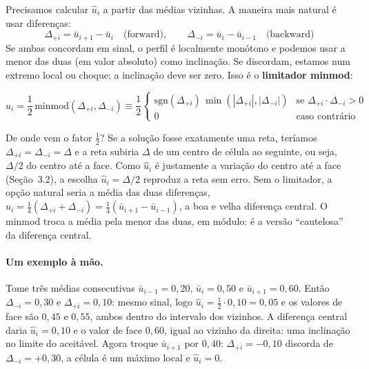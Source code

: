 \documentclass[10pt,a4paper]{article}
\newcommand{\ub}{\bar u}
\newcommand{\uh}{\hat u}
\begin{document}
Precisamos calcular $\uh_i$ a partir das médias vizinhas. A maneira mais natural é usar diferenças:
\begin{equation}\label{eq:deltas}
\Delta_{+i}=\ub_{i+1}-\ub_i\quad\text{(forward)},\qquad \Delta_{-i}=\ub_i-\ub_{i-1}\quad\text{(backward)}
\end{equation}
Se ambas concordam em sinal, o perfil é localmente monótono e podemos usar a menor das duas (em valor absoluto) como inclinação. Se discordam, estamos num extremo local ou choque; a inclinação deve ser zero. Isso é o \textbf{limitador minmod}:
\begin{destaque}
\begin{equation}\label{eq:minmod}
\uh_i=\frac12\,\mathrm{minmod}(\Delta_{+i},\Delta_{-i})\equiv\frac12
\begin{cases}
\mathrm{sgn}(\Delta_{+i})\,\min(|\Delta_{+i}|,|\Delta_{-i}|) & \text{se }\Delta_{+i}\cdot\Delta_{-i}>0\\[2pt]
0 & \text{caso contrário}
\end{cases}
\end{equation}
\end{destaque}

De onde vem o fator $\tfrac12$? Se a solução fosse exatamente uma reta, teríamos $\Delta_{+i}=\Delta_{-i}=\Delta$ e a reta subiria $\Delta$ de um centro de célula ao seguinte, ou seja, $\Delta/2$ do centro até a face. Como $\uh_i$ é justamente a variação do centro até a face (Seção~3.2), a escolha $\uh_i=\Delta/2$ reproduz a reta sem erro. Sem o limitador, a opção natural seria a média das duas diferenças, $\uh_i=\tfrac14(\Delta_{+i}+\Delta_{-i})=\tfrac14(\ub_{i+1}-\ub_{i-1})$, a boa e velha diferença central. O minmod troca a média pela menor das duas, em módulo: é a versão ``cautelosa'' da diferença central.

\paragraph{Um exemplo à mão.} Tome três médias consecutivas $\ub_{i-1}=0{,}20$, $\ub_i=0{,}50$ e $\ub_{i+1}=0{,}60$. Então $\Delta_{-i}=0{,}30$ e $\Delta_{+i}=0{,}10$: mesmo sinal, logo $\uh_i=\tfrac12\cdot0{,}10=0{,}05$ e os valores de face são $0{,}45$ e $0{,}55$, ambos dentro do intervalo dos vizinhos. A diferença central daria $\uh_i=0{,}10$ e o valor de face $0{,}60$, igual ao vizinho da direita: uma inclinação no limite do aceitável. Agora troque $\ub_{i+1}$ por $0{,}40$: $\Delta_{+i}=-0{,}10$ discorda de $\Delta_{-i}=+0{,}30$, a célula é um máximo local e $\uh_i=0$.
\end{document}
